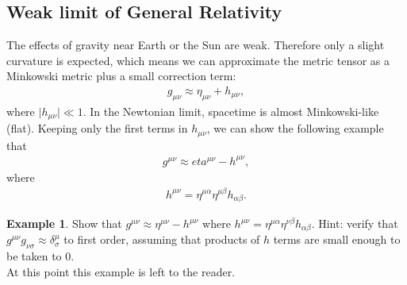 \documentclass{book}
\theoremstyle{definition}
\newtheorem{exmp}{Example}[section]
\begin{document}
\subsection{Weak limit of General Relativity}
The effects of gravity near Earth or the Sun are weak. Therefore only a slight curvature is expected, which means we can approximate the metric tensor as a Minkowski metric plus a small correction term:
\begin{align*}
g_{\mu\nu} \approx \eta_{\mu\nu} + h_{\mu\nu},
\end{align*}
where $\vert h_{\mu\nu} \vert \ll 1$. In the Newtonian limit, spacetime is almost Minkowski-like (flat). Keeping only the first terms in $h_{\mu\nu}$, we can show the following example that 
\begin{align*}
g^{\mu\nu} \approx eta^{\mu\nu} - h^{\mu\nu},
\end{align*}
where 
\begin{align*}
h^{\mu\nu} = \eta^{\mu\alpha}\eta^{\mu\beta}h_{\alpha\beta}.
\end{align*}

\begin{exmp}
	Show that $g^{\mu\nu} \approx \eta^{\mu\nu} - h^{\mu\nu}$ where $h^{\mu\nu} = \eta^{\mu\alpha}\eta^{\nu\beta}h_{\alpha\beta}$. Hint: verify that $g^{\mu\nu}g_{\nu\sigma} \approx \delta^{\mu}_{\sigma} $ to first order, assuming that products of $h$ terms are small enough to be taken to 0.\\
	
	At this point this example is left to the reader.\\ 
\end{exmp}
\end{document}
